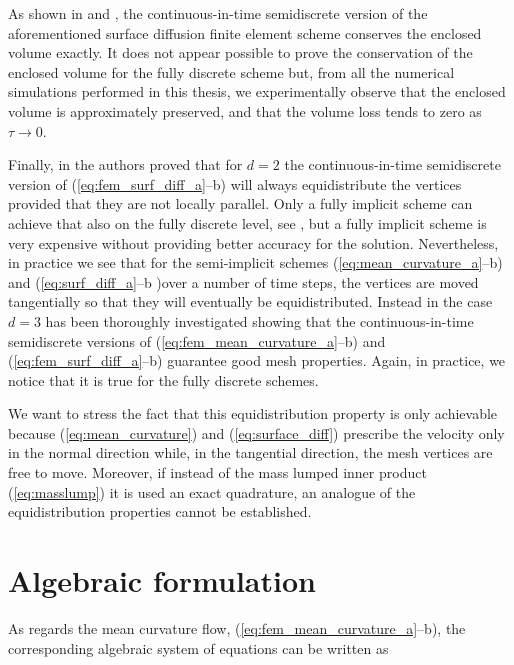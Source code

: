 As shown in \cite[Remark~2.3]{triplej} and \cite[\S~4]{gflows3d}, the
continuous-in-time semidiscrete version of the aforementioned surface
diffusion finite element scheme conserves the enclosed volume exactly. It does
not appear possible to prove the conservation of the enclosed volume for the
fully discrete scheme but, from all the numerical simulations performed in this
thesis, we experimentally observe that the enclosed volume is approximately
preserved, and that the volume loss tends to zero as $\tau \to 0$.

Finally, in \cite[Remark~2.4]{triplej} the authors proved that for $d=2$ the
continuous-in-time semidiscrete version of (\ref{eq:fem_surf_diff_a}--b)
will always equidistribute the vertices provided that they are not locally
parallel. Only a fully implicit scheme can achieve that also on the fully
discrete level, see \cite{fdfi}, but a fully implicit scheme is very
expensive without providing better accuracy for the solution. Nevertheless, in
practice we see that for the semi-implicit schemes
(\ref{eq:mean_curvature_a}--b) and (\ref{eq:surf_diff_a}--b )over a number of
time steps, the vertices are moved tangentially so that they will eventually be
equidistributed. Instead in \cite[\S~4]{gflows3d} the case $d=3$ has been
thoroughly investigated showing that the continuous-in-time semidiscrete
versions of (\ref{eq:fem_mean_curvature_a}--b) and
(\ref{eq:fem_surf_diff_a}--b) guarantee good mesh properties. Again, in
practice, we notice that it is true for the fully discrete schemes.

We want to stress the fact that this equidistribution property is only
achievable because (\ref{eq:mean_curvature}) and (\ref{eq:surface_diff})
prescribe the velocity only in the normal direction while, in the tangential
direction, the mesh vertices are free to move. Moreover, if instead of the mass
lumped inner product (\ref{eq:masslump}) it is used an exact quadrature, an
analogue of the equidistribution properties cannot be established.

\section{Algebraic formulation}\label{sec:geometric_pdes_algebraic}
As regards the mean curvature flow, (\ref{eq:fem_mean_curvature_a}--b), the
corresponding algebraic system of equations can be written as

